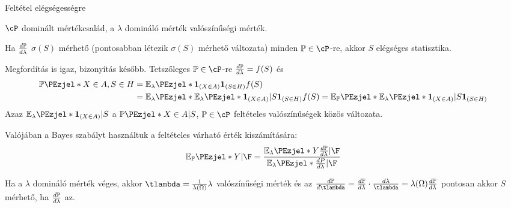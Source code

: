 \documentclass[aspectratio=169,notheorems,9pt,\option]{beamer}
\begin{document}
\begin{frame}{Feltétel elégségességre}
  \begin{proposition}
    $\cP$ dominált mértékcsalád, a $\lambda$ domináló mérték valószínűségi mérték.
  
    Ha $\frac{d\P}{d\lambda}$ $\sigma(S)$ mérhető (pontosabban létezik $\sigma(S)$ mérhető változata) minden $\P\in\cP$-re,
    akkor $S$ elégséges statisztika.
  \end{proposition}
  \continue 
  Megfordítás is igaz, bizonyítás később. 
  \pause
  Tetszőleges $\P\in\cP$-re $\frac{d\P}{d\lambda}=f(S)$ és
  \begin{align*}
    \P{X\in A,S\in H}&=\E[\lambda]{\I{X\in A}\I{S\in H}f(S)}\\
    &=\E[\lambda]{\E[\lambda]{\I{X\in A}|S}\I{S\in H}f(S)}
    =\E[\P]{\E[\lambda]{\I{X\in A}|S}\I{S\in H}}
  \end{align*}
  Azaz $\E[\lambda]{\I{X\in A}|S}$ a $\P{X\in A|S}$, $\P\in\cP$  feltételes valószínűségek közös változata.
    
  \pause
    Valójában a Bayes szabályt használtuk a feltételes várható érték kiszámítására:
    \begin{displaymath}
      \E[\P]{Y|\F}=\frac{\E[\lambda]{Y\frac{d\P}{d\lambda}|\F}}{\E[\lambda]{\frac{dP}{d\lambda}|\F}}
    \end{displaymath}
  \pause

  Ha a $\lambda$ domináló mérték véges, akkor $\tlambda=\frac{1}{\lambda(\Omega)}\lambda$ valószínűségi mérték és az 
    $\frac{d\P}{d\tlambda}=\frac{d\P}{d\lambda}\cdot\frac{d\lambda}{\tlambda}=\lambda(\Omega)\frac{d\P}{d\lambda}$
  pontosan akkor $S$ mérhető, ha $\frac{d\P}{d\lambda}$ az.  
\end{frame}
\end{document}
